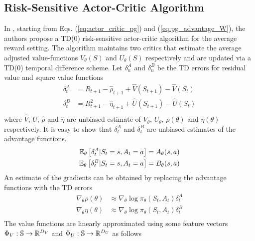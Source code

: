 \subsection{Risk-Sensitive Actor-Critic Algorithm}
In \cite{prashanth2014actor}, starting from Eqs. (\ref{eq:actor_critic_pg}) and 
(\ref{eq:pg_advantage_W}), the authors propose a TD(0) risk-sensitive actor-critic 
algorithm for the average reward setting. The algorithm maintains two critics that estimate the average adjusted value-functions $V_\theta(S)$ and $U_\theta(S)$ respectively and are updated via a TD(0) temporal difference scheme. Let $\delta_n^A$ and $\delta_n^B$ be the TD errors for residual value
and square value functions
\begin{equation}
	\begin{split}
		\delta_t^A &= R_{t+1} - \widehat{\rho}_{t+1} + \widehat{V}(S_{t+1}) -
		\widehat{V}(S_t)\\
		\delta_t^B &= R_{t+1}^2 - \widehat{\eta}_{t+1} + \widehat{U}(S_{t+1}) -
		\widehat{U}(S_t)\\
	\end{split}
\end{equation}
where $\widehat{V}$, $\widehat{U}$, $\widehat{\rho}$ and $\widehat{\eta}$ are
unbiased estimate of $V_\theta$, $U_\theta$, $\rho(\theta)$ and $\eta(\theta)$
respectively. It is easy to show that $\delta_t^A$ and $\delta_t^B$ are
unbiased estimates of the advantage functions.
\begin{equation*}
	\begin{split}
		\E[\theta]{\delta_t^A|S_t = s, A_t = a} &= A_\theta(s, a)\\
		\E[\theta]{\delta_t^B|S_t = s, A_t = a} &= B_\theta(s, a)\\
	\end{split}
\end{equation*}
An estimate of the gradients can be obtained by replacing the advantage functions with the TD errors
\begin{equation}
	\begin{split}
		\nabla_\theta \rho(\theta) &\approx \nabla_\theta \log \pi_\theta(S_t, A_t) \delta_t^A\\
		\nabla_\theta \eta(\theta) &\approx \nabla_\theta \log \pi_\theta(S_t, A_t) \delta_t^B\\
	\end{split}
\end{equation}
The value functions are linearly approximated using some feature vectors
$\Phi_V: \S \to \R^{D_V}$ and $\Phi_U: \S \to \R^{D_U}$ as follows
